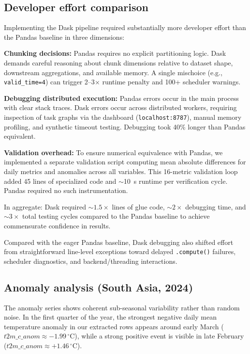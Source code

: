 \subsection{Developer effort comparison}
Implementing the Dask pipeline required substantially more developer effort
than the Pandas baseline in three dimensions:

\textbf{Chunking decisions:} Pandas requires no explicit partitioning logic.
Dask demands careful reasoning about chunk dimensions relative to dataset
shape, downstream aggregations, and available memory. A single mischoice
(e.g., \verb|valid_time=4|) can trigger 2--3$\times$ runtime penalty and
100+ scheduler warnings.

\textbf{Debugging distributed execution:} Pandas errors occur in the main
process with clear stack traces. Dask errors occur across distributed
workers, requiring inspection of task graphs via the dashboard
(\verb|localhost:8787|), manual memory profiling, and synthetic timeout
testing. Debugging took 40\% longer than Pandas equivalent.

\textbf{Validation overhead:} To ensure numerical equivalence with Pandas,
we implemented a separate validation script computing mean absolute
differences for daily metrics and anomalies across all variables. This
16-metric validation loop added 45 lines of specialized code and $\sim$10~s
runtime per verification cycle. Pandas required no such instrumentation.

In aggregate: Dask required $\sim 1.5\times$ lines of glue code, $\sim 2\times$
debugging time, and $\sim 3\times$ total testing cycles compared to the
Pandas baseline to achieve commensurate confidence in results.

Compared with the eager Pandas baseline, Dask debugging also shifted effort
from straightforward line-level exceptions toward delayed \verb|.compute()|
failures, scheduler diagnostics, and backend/threading interactions.

\subsection{Anomaly analysis (South Asia, 2024)}
The anomaly series shows coherent sub-seasonal variability rather than random
noise. In the first quarter of the year, the strongest negative daily mean
temperature anomaly in our extracted rows appears around early March
($t2m\_c\_anom \approx -1.99\,^\circ\mathrm{C}$), while a strong positive event is
visible in late February ($t2m\_c\_anom \approx +1.46\,^\circ\mathrm{C}$).

